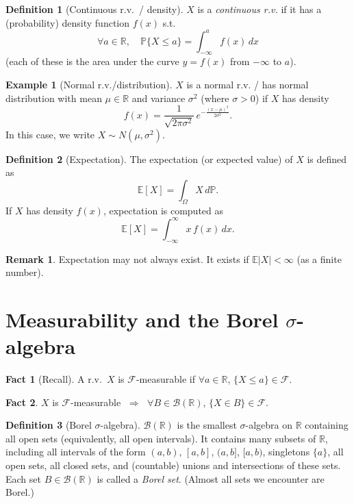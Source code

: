 \documentclass[11pt]{article}
\newcommand{\Prob}{\mathbb{P}}
\theoremstyle{definition}
\newtheorem{definition}{Definition}[section]
\newtheorem{example}{Example}[section]
\newtheorem{remark}{Remark}[section]
\newtheorem{fact}{Fact}[section]
\begin{document}
\begin{definition}[Continuous r.v.\ / density]
$X$ is a \emph{continuous r.v.} if it has a (probability) density function
$f(x)$ s.t.
\[
  \forall a \in \mathbb{R}, \quad
  \Prob\{X \le a\} = \int_{-\infty}^{a} f(x)\,dx
\]
(each of these is the area under the curve $y = f(x)$ from $-\infty$ to $a$).
\end{definition}

\begin{example}[Normal r.v./distribution]
$X$ is a normal r.v. / has normal distribution with mean $\mu \in \mathbb{R}$
and variance $\sigma^2$ (where $\sigma > 0$) if $X$ has density
\[
  f(x) = \frac{1}{\sqrt{2\pi\sigma^2}}\, e^{-\frac{(x-\mu)^2}{2\sigma^2}}.
\]
In this case, we write $X \sim N(\mu, \sigma^2)$.
\end{example}

\begin{definition}[Expectation]
The expectation (or expected value) of $X$ is defined as
\[
  \mathbb{E}[X] = \int_{\Omega} X\, d\Prob.
\]
If $X$ has density $f(x)$, expectation is computed as
\[
  \mathbb{E}[X] = \int_{-\infty}^{\infty} x\, f(x)\, dx.
\]
\end{definition}

\begin{remark}
Expectation may not always exist. It exists if $\mathbb{E}|X| < \infty$
(as a finite number).
\end{remark}

\section{Measurability and the Borel $\sigma$-algebra}

\begin{fact}[Recall]
A r.v.\ $X$ is $\mathcal{F}$-measurable if
$\forall a \in \mathbb{R}$, $\{X \le a\} \in \mathcal{F}$.
\end{fact}

\begin{fact}
$X$ is $\mathcal{F}$-measurable
$\;\Longrightarrow\;$ $\forall B \in \mathcal{B}(\mathbb{R})$,
$\{X \in B\} \in \mathcal{F}$.
\end{fact}

\begin{definition}[Borel $\sigma$-algebra]
$\mathcal{B}(\mathbb{R})$ is the smallest $\sigma$-algebra on $\mathbb{R}$
containing all open sets (equivalently, all open intervals). It contains
many subsets of $\mathbb{R}$, including all intervals of the form
$(a,b)$, $[a,b]$, $(a,b]$, $[a,b)$, singletons $\{a\}$, all open sets,
all closed sets, and (countable) unions and intersections of these sets.
Each set $B \in \mathcal{B}(\mathbb{R})$ is called a \emph{Borel set}.
(Almost all sets we encounter are Borel.)
\end{definition}
\end{document}
